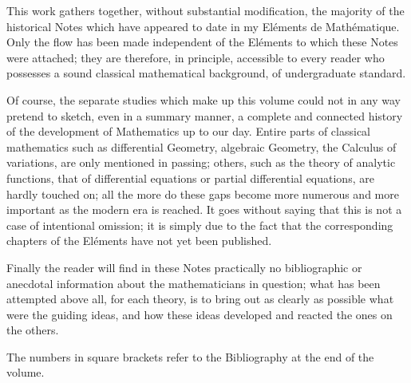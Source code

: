 
This work gathers together, without substantial modification, the majority of the historical Notes which have appeared to date in my Eléments de Mathématique. Only the flow has been made independent of the Eléments to which these Notes were attached; they are therefore, in principle, accessible to every reader who possesses a sound classical mathematical background, of undergraduate standard.

Of course, the separate studies which make up this volume could not in any way pretend to sketch, even in a summary manner, a complete and connected history of the development of Mathematics up to our day. Entire parts of classical mathematics such as differential Geometry, algebraic Geometry, the Calculus of variations, are only mentioned in passing; others, such as the theory of analytic functions, that of differential equations or partial differential equations, are hardly touched on; all the more do these gaps become more numerous and more important as the modern era is reached. It goes without saying that this is not a case of intentional omission; it is simply due to the fact that the corresponding chapters of the Eléments have not yet been published.

Finally the reader will find in these Notes practically no bibliographic or anecdotal information about the mathematicians in question; what has been attempted above all, for each theory, is to bring out as clearly as possible what were the guiding ideas, and how these ideas developed and reacted the ones on the others.

The numbers in square brackets refer to the Bibliography at the end of the volume.

\tableofcontents
\mainmatter

